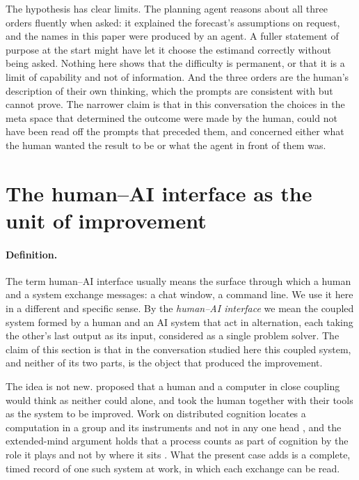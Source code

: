 \documentclass[11pt,a4paper]{article}
\begin{document}
The hypothesis has clear limits. The planning agent reasons about all three orders fluently when asked: it explained the forecast's assumptions on request, and the names in this paper were produced by an agent. A fuller statement of purpose at the start might have let it choose the estimand correctly without being asked. Nothing here shows that the difficulty is permanent, or that it is a limit of capability and not of information. And the three orders are the human's description of their own thinking, which the prompts are consistent with but cannot prove. The narrower claim is that in this conversation the choices in the meta space that determined the outcome were made by the human, could not have been read off the prompts that preceded them, and concerned either what the human wanted the result to be or what the agent in front of them was.

\section{The human--AI interface as the unit of improvement}
\label{sec:interface}

\paragraph{Definition.} The term human--AI interface usually means the surface through which a human and a system exchange messages: a chat window, a command line. We use it here in a different and specific sense. By the \emph{human--AI interface} we mean the coupled system formed by a human and an AI system that act in alternation, each taking the other's last output as its input, considered as a single problem solver. The claim of this section is that in the conversation studied here this coupled system, and neither of its two parts, is the object that produced the improvement.

The idea is not new. \citet{licklider1960} proposed that a human and a computer in close coupling would think as neither could alone, and \citet{engelbart1962} took the human together with their tools as the system to be improved. Work on distributed cognition locates a computation in a group and its instruments and not in any one head \citep{hutchins1995}, and the extended-mind argument holds that a process counts as part of cognition by the role it plays and not by where it sits \citep{clark1998}. What the present case adds is a complete, timed record of one such system at work, in which each exchange can be read.
\end{document}
